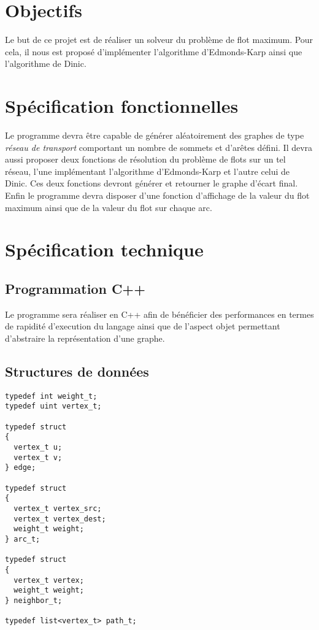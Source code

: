 \section{Objectifs}
Le but de ce projet est de réaliser un solveur du problème de flot maximum. Pour cela, il 
nous est proposé d’implémenter l'algorithme d'Edmonds-Karp ainsi que l'algorithme de Dinic.

\section{Spécification fonctionnelles}

Le programme devra être capable de générer aléatoirement des graphes de type \emph{réseau de transport}
comportant un nombre de sommets et d'arêtes défini. Il devra aussi proposer deux fonctions 
de résolution du problème de flots sur un tel réseau, l'une implémentant l'algorithme d'Edmonds-Karp et
l'autre celui de Dinic. Ces deux fonctions devront générer et retourner le graphe d'écart final. Enfin
le programme devra disposer d'une fonction d'affichage de la valeur du flot maximum ainsi que de la 
valeur du flot sur chaque arc.

\section{Spécification technique}

\subsection{Programmation C++}
Le programme sera réaliser en C++ afin de bénéficier des performances en termes de rapidité d'execution 
du langage ainsi que de l'aspect objet permettant d'abstraire la représentation d'une graphe.

\subsection{Structures de données}

\begin{verbatim}
typedef int weight_t;
typedef uint vertex_t;

typedef struct
{
  vertex_t u;
  vertex_t v;
} edge;

typedef struct
{
  vertex_t vertex_src;
  vertex_t vertex_dest;
  weight_t weight;
} arc_t;

typedef struct
{
  vertex_t vertex;
  weight_t weight;
} neighbor_t;
  
typedef list<vertex_t> path_t;

\end{verbatim}

